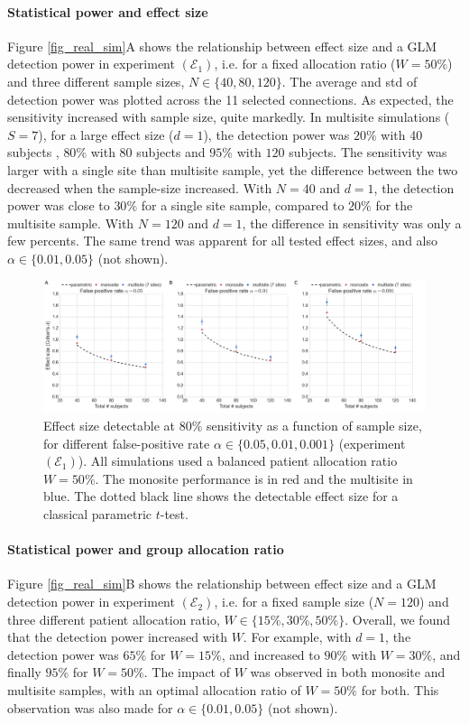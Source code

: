 \documentclass[authoryear]{elsarticle}
\begin{document}
\paragraph{Statistical power and effect size} Figure \ref{fig_real_sim}A shows the relationship between effect size and a GLM detection power in experiment $(\mathcal{E}_1)$, i.e. for a fixed allocation ratio ($W=50\%$) and three different sample sizes, $N\in\{40, 80, 120\}$. The average and std of detection power was plotted across the 11 selected connections. As expected, the sensitivity increased with sample size, quite markedly. In multisite simulations ($S=7$), for a large effect size ($d=1$), the detection power was $20\%$ with 40 subjects , $80\%$ with 80 subjects and $95\%$ with $120$ subjects. The sensitivity was larger with a single site than multisite sample, yet the difference between the two decreased when the sample-size increased. With $N=40$ and $d=1$, the detection power was close to $30\%$ for a single site sample, compared to $20\%$ for the multisite sample. With $N=120$ and $d=1$, the difference in sensitivity was only a few percents. The same trend was apparent for all tested effect sizes, and also $\alpha\in\{0.01,0.05\}$ (not shown). 
\par
\begin{figure}[htbp]\centering
\includegraphics[width=\textwidth]{../figures/samplesize_x_effectsize.png}
\caption[]{
Effect size detectable at $80\%$ sensitivity as a function of sample size, for different false-positive rate $\alpha\in \{0.05,0.01,0.001\}$ (experiment $(\mathcal{E}_1)$). All simulations used a balanced patient allocation ratio $W=50\%$. The monosite performance is in red and the multisite in blue. The dotted black line shows the detectable effect size for a classical parametric $t$-test. 
}
\label{fig_sampeffect_curves_alpha001}
\end{figure}

\paragraph{Statistical power and group allocation ratio} Figure \ref{fig_real_sim}B shows the relationship between effect size and a GLM detection power in experiment $(\mathcal{E}_2)$, i.e. for a fixed sample size ($N=120$) and three different patient allocation ratio, $W\in \{15\%, 30\%,50\%\}$. Overall, we found that the detection power increased with $W$. For example, with $d=1$, the detection power was $65\%$ for $W=15\%$, and increased to $90\%$ with $W=30\%$, and finally $95\%$ for $W=50\%$. The impact of $W$ was observed in both monosite and multisite samples, with an optimal allocation ratio of $W=50\%$ for both. This observation was also made for $\alpha\in\{0.01,0.05\}$ (not shown). 
\end{document}
